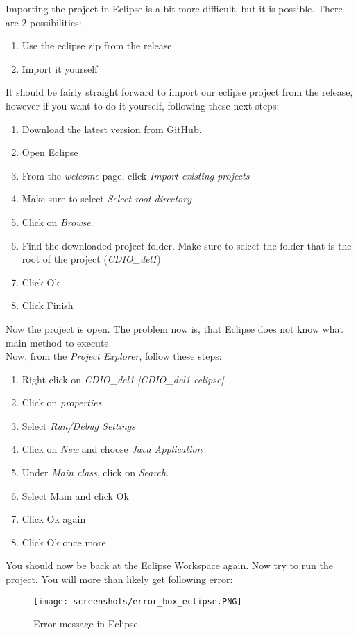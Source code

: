 Importing the project in Eclipse is a bit more difficult, but it is possible. There are 2 possibilities:
\begin{enumerate}
    \item Use the eclipse zip from the release
    \item Import it yourself
\end{enumerate}
It should be fairly straight forward to import our eclipse project from the release, however if you want to do it yourself, following these next steps:
\begin{enumerate}
    \item Download the latest version from GitHub.
    \item Open Eclipse
    \item From the \textit{welcome} page, click \textit{Import existing projects}
    \item Make sure to select \textit{Select root directory}
    \item Click on \textit{Browse}.
    \item Find the downloaded project folder. Make sure to select the folder that is the root of the project (\textit{CDIO\_del1})
    \item Click Ok
    \item Click Finish
\end{enumerate}
Now the project is open. The problem now is, that Eclipse does not know what main method to execute.\\
Now, from the \textit{Project Explorer}, follow these steps:
\begin{enumerate}
    \item Right click on \textit{CDIO\_del1 [CDIO\_del1 eclipse]}
    \item Click on \textit{properties}
    \item Select \textit{Run/Debug Settings}
    \item Click on \textit{New} and choose \textit{Java Application}
    \item Under \textit{Main class}, click on \textit{Search}.
    \item Select Main and click Ok
    \item Click Ok again
    \item Click Ok once more
\end{enumerate}
You should now be back at the Eclipse Workspace again. Now try to run the project. You will more than likely get following error:

\begin{figure}[H] %
    \centering
    \texttt{[image: screenshots/error\_box\_eclipse.PNG]}
    \caption{Error message in Eclipse}
    \label{fig:eclipse_error}
\end{figure}

